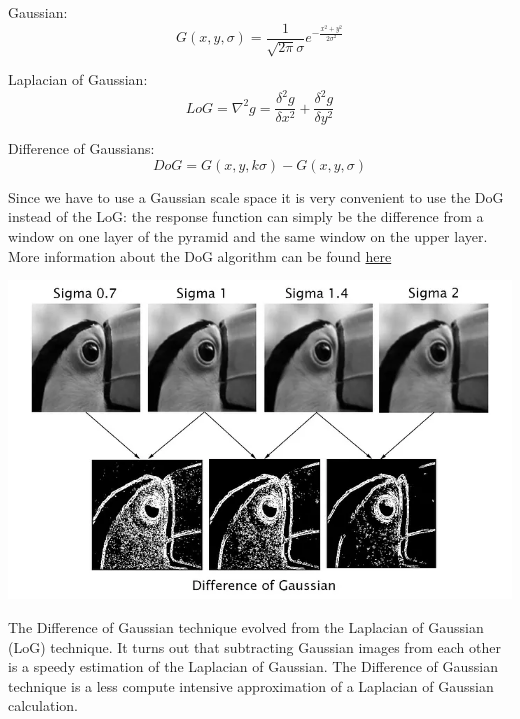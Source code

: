 \documentclass{article}
\begin{document}
Gaussian:
\begin{equation*}
    G(x,y,\sigma) = \frac{1}{\sqrt{2\pi }\sigma}e^{-\frac{x^2+y^2}{2\sigma^2}}
\end{equation*}

Laplacian of Gaussian:
\begin{equation*}
    LoG = \nabla^2g = \frac{\delta^2g}{\delta x^2} + \frac{\delta^2g}{\delta y^2} 
\end{equation*}

Difference of Gaussians:
\begin{equation*}
    DoG = G(x,y,k\sigma) - G(x,y,\sigma)    
\end{equation*}

Since we have to use a Gaussian scale space it is very convenient to use the DoG instead of the LoG: the response function can simply be the difference from a window on one layer of the pyramid and the same window on the upper layer. More information about the DoG algorithm can be found \href{https://medium.com/@vad710/cv-for-busy-devs-improving-features-df20c3aa5887#:~:text=The%20Difference%20of%20Gaussian%20(DoG)%20technique%20is%20a%20highly%20influential,adjacent%20images%20from%20each%20other.}{here}

\begin{center}
    \includegraphics[width=.9\linewidth]{images/dog.png}
\end{center}

The Difference of Gaussian technique evolved from the Laplacian of Gaussian (LoG) technique. It turns out that subtracting Gaussian images from each other is a speedy estimation of the Laplacian of Gaussian. The Difference of Gaussian technique is a less compute intensive approximation of a Laplacian of Gaussian calculation.

\newpage
\end{document}
